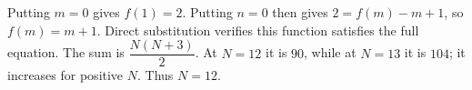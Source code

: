 Putting $m=0$ gives $f(1)=2$. Putting $n=0$ then gives $2=f(m)-m+1$, so $f(m)=m+1$. Direct substitution verifies this function satisfies the full equation. The sum is $\dfrac{N(N+3)}{2}$. At $N=12$ it is $90$, while at $N=13$ it is $104$; it increases for positive $N$. Thus $\boxed{N=12}$.
